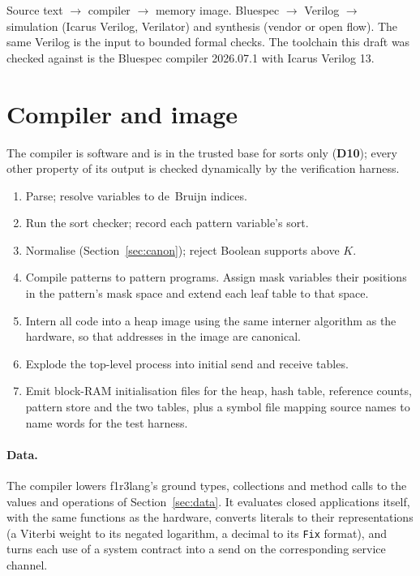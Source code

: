 \documentclass[11pt]{article}
\newcommand{\kw}[1]{\texttt{#1}}
\newcommand{\dec}[1]{\textbf{D#1}}
\theoremstyle{definition}
\theoremstyle{remark}
\begin{document}
Source text $\to$ compiler $\to$ memory image. Bluespec $\to$ Verilog $\to$
simulation (Icarus Verilog, Verilator) and synthesis (vendor or open flow).
The same Verilog is the input to bounded formal checks. The toolchain this
draft was checked against is the Bluespec compiler 2026.07.1 with Icarus
Verilog 13.

\section{Compiler and image}\label{sec:compiler}

The compiler is software and is in the trusted base for sorts only
(\dec{10}); every other property of its output is checked dynamically by the
verification harness.

\begin{enumerate}
\item Parse; resolve variables to de~Bruijn indices.
\item Run the sort checker; record each pattern variable's sort.
\item Normalise (Section~\ref{sec:canon}); reject Boolean supports above $K$.
\item Compile patterns to pattern programs. Assign mask variables their
positions in the pattern's mask space and extend each leaf table to that
space.
\item Intern all code into a heap image using the same interner algorithm
as the hardware, so that addresses in the image are canonical.
\item Explode the top-level process into initial send and receive tables.
\item Emit block-RAM initialisation files for the heap, hash table, reference
counts, pattern store and the two tables, plus a symbol file mapping source
names to name words for the test harness.
\end{enumerate}

\paragraph{Data.} The compiler lowers f1r3lang's ground types, collections
and method calls to the values and operations of Section~\ref{sec:data}. It
evaluates closed applications itself, with the same functions as the
hardware, converts literals to their representations (a Viterbi weight to
its negated logarithm, a decimal to its \kw{Fix} format), and turns each use
of a system contract into a send on the corresponding service channel.
\end{document}
